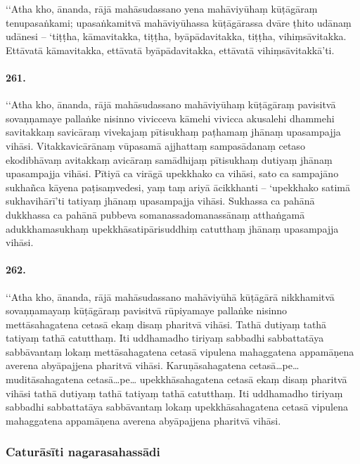 ‘‘Atha kho, ānanda, rājā mahāsudassano yena mahāviyūhaṃ kūṭāgāraṃ tenupasaṅkami; upasaṅkamitvā mahāviyūhassa kūṭāgārassa dvāre ṭhito udānaṃ udānesi – ‘tiṭṭha, kāmavitakka, tiṭṭha, byāpādavitakka, tiṭṭha, vihiṃsāvitakka. Ettāvatā kāmavitakka, ettāvatā byāpādavitakka, ettāvatā vihiṃsāvitakkā’ti.

\paragraph{261.} ‘‘Atha kho, ānanda, rājā mahāsudassano mahāviyūhaṃ kūṭāgāraṃ pavisitvā sovaṇṇamaye pallaṅke nisinno vivicceva kāmehi vivicca akusalehi dhammehi savitakkaṃ savicāraṃ vivekajaṃ pītisukhaṃ paṭhamaṃ jhānaṃ upasampajja vihāsi. Vitakkavicārānaṃ vūpasamā ajjhattaṃ sampasādanaṃ cetaso ekodibhāvaṃ avitakkaṃ avicāraṃ samādhijaṃ pītisukhaṃ dutiyaṃ jhānaṃ upasampajja vihāsi. Pītiyā ca virāgā upekkhako ca vihāsi, sato ca sampajāno sukhañca kāyena paṭisaṃvedesi, yaṃ taṃ ariyā ācikkhanti – ‘upekkhako satimā sukhavihārī’ti tatiyaṃ jhānaṃ upasampajja vihāsi. Sukhassa ca pahānā dukkhassa ca pahānā pubbeva somanassadomanassānaṃ atthaṅgamā adukkhamasukhaṃ upekkhāsatipārisuddhiṃ catutthaṃ jhānaṃ upasampajja vihāsi.

\paragraph{262.} ‘‘Atha kho, ānanda, rājā mahāsudassano mahāviyūhā kūṭāgārā nikkhamitvā sovaṇṇamayaṃ kūṭāgāraṃ pavisitvā rūpiyamaye pallaṅke nisinno mettāsahagatena cetasā ekaṃ disaṃ pharitvā vihāsi. Tathā dutiyaṃ tathā tatiyaṃ tathā catutthaṃ. Iti uddhamadho tiriyaṃ sabbadhi sabbattatāya sabbāvantaṃ lokaṃ mettāsahagatena cetasā vipulena mahaggatena appamāṇena averena abyāpajjena pharitvā vihāsi. Karuṇāsahagatena cetasā…pe… muditāsahagatena cetasā…pe… upekkhāsahagatena cetasā ekaṃ disaṃ pharitvā vihāsi tathā dutiyaṃ tathā tatiyaṃ tathā catutthaṃ. Iti uddhamadho tiriyaṃ sabbadhi sabbattatāya sabbāvantaṃ lokaṃ upekkhāsahagatena cetasā vipulena mahaggatena appamāṇena averena abyāpajjena pharitvā vihāsi.

\subsubsection{Caturāsīti nagarasahassādi}

